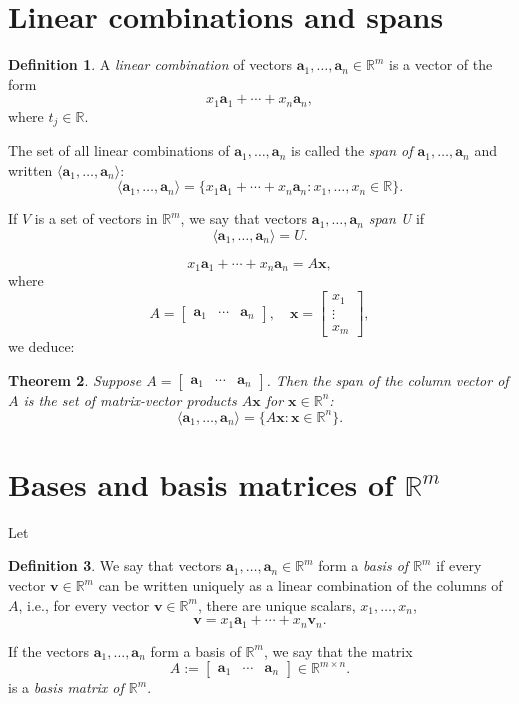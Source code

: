 \documentclass[12pt]{amsart}
\newcommand{\RR}{\mathbb{R}}
\newtheorem{theorem}{Theorem}[section]
\theoremstyle{definition}
\newtheorem{definition}[theorem]{Definition}
\newcommand{\ba}{\mathbf{a}}
\newcommand{\bv}{\mathbf{v}}
\newcommand{\bx}{\mathbf{x}}
\newcommand{\bas}{\ba_1,\ldots,\ba_n}
\newcommand{\mat}[1]{\begin{bmatrix}#1\end{bmatrix}}
\begin{document}
\setlength{\parskip}{0.5em}
\setlength{\parindent}{0em}
\setlength{\itemsep}{0.5em}

\section{Linear combinations and spans}

\begin{definition}\label{df:lc_span}
	A \emph{linear combination} of vectors $\ba_1,\ldots,\ba_n\in\RR^m$ is a vector of the form 
	\[
		x_1\ba_1+\cdots +x_n\ba_n,
	\]
	where $t_j\in \RR$.

	The set of all linear combinations of $\ba_1,\ldots,\ba_n$ is called the
	\emph{span of $\ba_1,\ldots,\ba_n$} and written
	$\langle \ba_1,\ldots,\ba_n\rangle$:
	\[
		\langle \ba_1,\ldots,\ba_n\rangle 
		= \{x_1\ba_1+\cdots + x_n\ba_n : x_1,\ldots,x_n\in\RR\}.
	\]

	If $V$ is a set of vectors in $\RR^m$, we say that vectors $\ba_1,\ldots,\ba_n$
	\emph{span U} if
	\[
		\langle \ba_1,\ldots,\ba_n\rangle = U.
	\]
\end{definition}
\[
	x_1\ba_1+\cdots + x_n\ba_n = A\bx,
\]
where
\[
	A=\mat{\ba_1&\cdots&\ba_n},\quad \bx=\mat{x_1\\\vdots\\x_m},
\]
we deduce:
\begin{theorem}\label{th:lc-matvec}
	Suppose $A=\mat{\ba_1&\cdots&\ba_n}$. Then the span of the column vector
	of $A$ is the set of matrix-vector products $A\bx$ for $\bx\in\RR^n$:
	\[
		\langle \bas\rangle = \{A\bx : \bx\in\RR^n\}.
	\]
\end{theorem}




\section{Bases and basis matrices of $\RR^m$}
Let
\begin{definition}
	We say that vectors $\ba_1,\ldots,\ba_n\in\RR^m$ form a \emph{basis of $\RR^m$} if every vector 
	$\bv\in \RR^m$ can be written uniquely as a linear combination of the columns of $A$, i.e.,
	for every vector $\bv\in\RR^m$, there are unique scalars, $x_1,\ldots,x_n$,
	\[
		\bv=x_1\ba_1 + \cdots + x_n\bv_n.
	\]

	If the vectors $\ba_1,\ldots,\ba_n$ form a basis of $\RR^m$, we say that the matrix
	\[
		A:=\mat{\ba_1&\cdots&\ba_n}\in\RR^{m\times n}.
	\]
	is a \emph{basis matrix of $\RR^m$}.

\end{definition}
\end{document}
